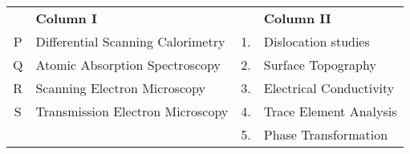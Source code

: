 \begin{tabular}{clcl}
&\textbf{Column I} & & \textbf{Column II}  \\
P & Differential Scanning Calorimetry & 1. & Dislocation studies \\
Q & Atomic Absorption Spectroscopy & 2. & Surface Topography \\
R & Scanning Electron Microscopy & 3. & Electrical Conductivity \\
S & Transmission Electron Microscopy & 4. & Trace Element Analysis \\
  &                             & 5. & Phase Transformation \\
\end{tabular}